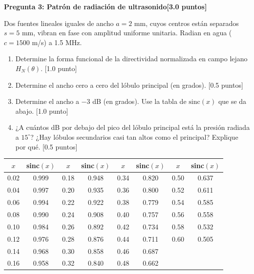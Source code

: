 \documentclass[11pt,a4paper]{article}
\newcommand{\question}[2]{\vspace{6pt}\textbf{#1}\hfill\textbf{[#2]}\par}
\newcommand{\pts}[1]{\hfill[#1]}
\begin{document}
\question{Pregunta 3: Patrón de radiación de ultrasonido}{3.0 puntos}
Dos fuentes lineales iguales de ancho $a = 2$ mm, cuyos centros están separados $s = 5$ mm, vibran en fase con amplitud uniforme unitaria. Radian en agua ($c = 1500$ m/s) a 1.5 MHz.
\begin{center}
\end{center}
\begin{enumerate}
\item Determine la forma funcional de la directividad normalizada en campo lejano $H_N(\theta)$. \pts{1.0 punto}
\item Determine el ancho cero a cero del lóbulo principal (en grados). \pts{0.5 puntos}
\item Determine el ancho a $-3$ dB (en grados). Use la tabla de $\mathrm{sinc}(x)$ que se da abajo. \pts{1.0 punto}
\item ¿A cuántos dB por debajo del pico del lóbulo principal está la presión radiada a $15^\circ$? ¿Hay lóbulos secundarios casi tan altos como el principal? Explique por qué. \pts{0.5 puntos}
\end{enumerate}
\begin{center}\small
\begin{tabular}{c|c||c|c||c|c||c|c}
$x$ & sinc$(x)$ & $x$ & sinc$(x)$ & $x$ & sinc$(x)$ & $x$ & sinc$(x)$\\\hline
0.02 & 0.999 & 0.18 & 0.948 & 0.34 & 0.820 & 0.50 & 0.637\\
0.04 & 0.997 & 0.20 & 0.935 & 0.36 & 0.800 & 0.52 & 0.611\\
0.06 & 0.994 & 0.22 & 0.922 & 0.38 & 0.779 & 0.54 & 0.585\\
0.08 & 0.990 & 0.24 & 0.908 & 0.40 & 0.757 & 0.56 & 0.558\\
0.10 & 0.984 & 0.26 & 0.892 & 0.42 & 0.734 & 0.58 & 0.532\\
0.12 & 0.976 & 0.28 & 0.876 & 0.44 & 0.711 & 0.60 & 0.505\\
0.14 & 0.968 & 0.30 & 0.858 & 0.46 & 0.687 & & \\
0.16 & 0.958 & 0.32 & 0.840 & 0.48 & 0.662 & &
\end{tabular}
\end{center}
\end{document}
